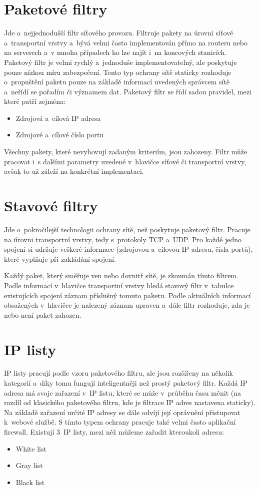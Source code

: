 \section{Paketové filtry}
Jde o~nejjednodušší filtr síťového provozu. Filtruje pakety na úrovni síťové a~transportní vrstvy a~bývá velmi často implementován přímo na routeru nebo na serverech a~v mnoha případech ho lze najít i~na koncových stanicích. Paketový filtr je velmi rychlý a~jednoduše implementovatelný, ale poskytuje pouze nízkou míru zabezpečení. Tento typ ochrany sítě staticky rozhoduje o~propuštění paketu pouze na základě informací uvedených správcem sítě a~neřídí se pořadím či významem dat. Paketový filtr se řídí sadou pravidel, mezi které patří zejména:
\begin{itemize}
	\item Zdrojová a~cílová IP adresa
	\item Zdrojové a~cílové číslo portu
\end{itemize}
Všechny pakety, které nevyhovují zadaným kriteriím, jsou zahozeny. Filtr může pracovat i~s dalšími parametry uvedené v~hlavičce síťové či transportní vrstvy, avšak to už záleží na konkrétní implementaci.

\section{Stavové filtry}
Jde o~pokročilejší technologii ochrany sítě, než poskytuje paketový filtr. Pracuje na úrovni transportní vrstvy, tedy s~protokoly TCP a~UDP. Pro každé jedno spojení si udržuje veškeré informace (zdrojovou a~cílovou IP adresu, čísla portů), které vyplňuje při zakládání spojení.

Každý paket, který směřuje ven nebo dovnitř sítě, je zkoumán tímto filtrem. Podle informací v~hlavičce transportní vrstvy hledá stavový filtr v~tabulce existujících spojení záznam příslušný tomuto paketu. Podle aktuálních informací obsažených v~hlavičce je nalezený záznam upraven a~dále filtr rozhoduje, zda je nebo není paket zahozen.

\section{IP listy}
\label{sec:ip_lists}
IP listy pracují podle vzoru paketového filtru, ale jsou rozšířeny na několik kategorií a~díky tomu fungují inteligentněji než prostý paketový filtr. Každá IP adresa má svoje zařazení v~IP listu, které se může v~průběhu času měnit (na rozdíl od klasického paketového filtru, kde je filtrace IP adres nastavena staticky). Na základě zařazení určité IP adresy se dále odvíjí její oprávnění přistupovat k~webové službě. S tímto typem ochrany pracuje také velmi často aplikační firewall. Existují 3~IP listy, mezi něž můžeme zařadit kteroukoli adresu:
\begin{itemize}
	\item White list
	\item Gray list
	\item Black list
\end{itemize}

